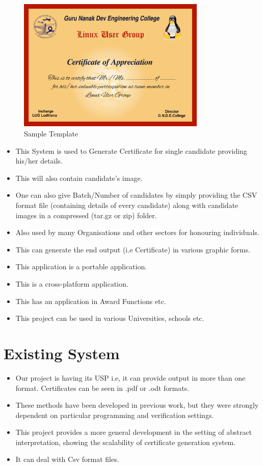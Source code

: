 \begin{figure}[!ht]
\centering
\includegraphics[width=0.8\textwidth]{images/gndec.jpg}                   
\caption{Sample Template}
\hspace{-1.5em}
\end{figure}
\begin{itemize}
\item This System is used to Generate Certificate for single candidate providing his/her details.
\item This will also contain candidate's image. 
\item One can also give Batch/Number of candidates by simply providing the CSV format file (containing details of every candidate) along with candidate images in a compressed (tar.gz or zip) folder.
\item Also used by many Organisations and other sectors for honouring individuals.
\item This can generate the end output (i.e Certificate) in various graphic forms.
\item This application is a portable application.
\item This is a cross-platform application.
\item This has an application in Award Functions etc.
\item This project can be used in various Universities, schools etc.
\end{itemize}
\newpage
\section{Existing System}
\begin{itemize}
\item Our project is having its USP i.e, it can provide output in more than one format. Certificates can be seen in .pdf or .odt formats.
\item These methods have been developed in previous work, but they were strongly dependent on particular programming and verification settings. 
\item This project provides a more general development in the setting of abstract interpretation, showing the scalability of
certificate generation system.
\item It can deal with Csv format files.
\end{itemize}
